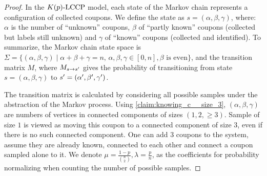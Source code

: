 \begin{proof}
In the $\fmecd{K(p)}{}{n}$ model, each state of the Markov chain represents a configuration of collected coupons.  
We define the state as $s = (\alpha, \beta, \gamma)$, where:
$\alpha$ is the number of ``unknown'' coupons,
$\beta$ of ``partly known'' coupons (collected but labels still unknown) and
$\gamma$ of ``known'' coupons (collected and identified).
To summarize, the Markov chain state space is
$\Sigma = \{(\alpha, \beta, \gamma) \mid \alpha + \beta + \gamma = n, \, \alpha, \beta, \gamma \in [0,n],  \beta \text{ is even}\}$,
and the transition matrix $M$, where $M_{s \to \ns}$ gives the probability of transitioning from state $s = (\alpha, \beta, \gamma)$ to $\ns = (\alpha', \beta', \gamma')$.

The transition matrix is calculated by considering all possible samples under the abstraction of the Markov process.
Using \autoref{claim:knowing_c__size_3}, $(\alpha, \beta, \gamma)$ are numbers of vertices in connected components of sizes $(1,2, \geq3)$.
Sample of size $1$ is viewed as moving this coupon to a connected component of size $3$, 
even if there is no such connected component.
One can add $3$ coupons to the system, assume they are already known, connected to each other and connect a coupon sampled alone to it.
We denote
$\mu = \frac{1-p}{\binom{n}{2}}, \lambda = \frac{p}{n}$,
as the coefficients for probability normalizing when counting the number of possible samples.


\end{proof}
